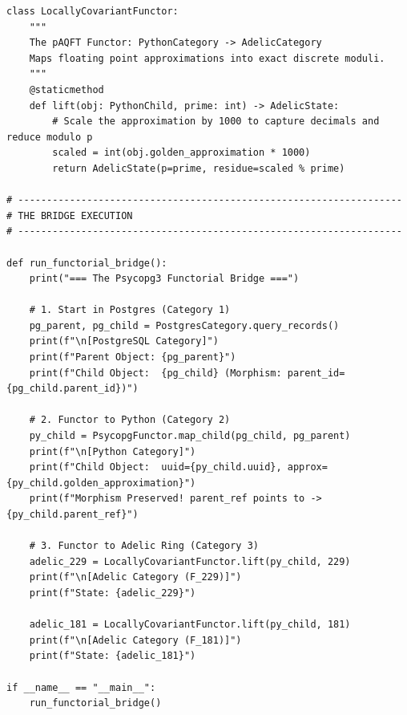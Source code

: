 \begin{verbatim}
class LocallyCovariantFunctor:
    """
    The pAQFT Functor: PythonCategory -> AdelicCategory
    Maps floating point approximations into exact discrete moduli.
    """
    @staticmethod
    def lift(obj: PythonChild, prime: int) -> AdelicState:
        # Scale the approximation by 1000 to capture decimals and reduce modulo p
        scaled = int(obj.golden_approximation * 1000)
        return AdelicState(p=prime, residue=scaled % prime)

# -------------------------------------------------------------------
# THE BRIDGE EXECUTION
# -------------------------------------------------------------------

def run_functorial_bridge():
    print("=== The Psycopg3 Functorial Bridge ===")
    
    # 1. Start in Postgres (Category 1)
    pg_parent, pg_child = PostgresCategory.query_records()
    print(f"\n[PostgreSQL Category]")
    print(f"Parent Object: {pg_parent}")
    print(f"Child Object:  {pg_child} (Morphism: parent_id={pg_child.parent_id})")
    
    # 2. Functor to Python (Category 2)
    py_child = PsycopgFunctor.map_child(pg_child, pg_parent)
    print(f"\n[Python Category]")
    print(f"Child Object:  uuid={py_child.uuid}, approx={py_child.golden_approximation}")
    print(f"Morphism Preserved! parent_ref points to -> {py_child.parent_ref}")
    
    # 3. Functor to Adelic Ring (Category 3)
    adelic_229 = LocallyCovariantFunctor.lift(py_child, 229)
    print(f"\n[Adelic Category (F_229)]")
    print(f"State: {adelic_229}")
    
    adelic_181 = LocallyCovariantFunctor.lift(py_child, 181)
    print(f"\n[Adelic Category (F_181)]")
    print(f"State: {adelic_181}")

if __name__ == "__main__":
    run_functorial_bridge()
\end{verbatim}


